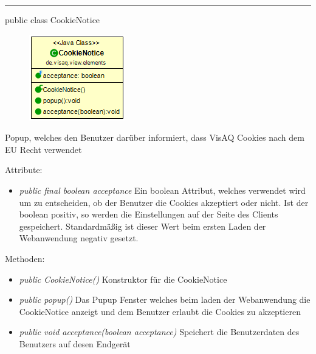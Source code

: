\clearpage %
\rule{\textwidth}{0.4pt}
public class CookieNotice

\begin{minipage}{0.3\textwidth}
    \begin{figure}[H]
        \includegraphics[scale = 0.6]{media/frontend/view/de.view.elements/CookieNotice_Class.png}
    \end{figure}
    \end{minipage} \hfill
    \begin{minipage}{0.6\textwidth}
Popup, welches den Benutzer darüber informiert, dass VisAQ Cookies nach dem EU Recht verwendet
\end{minipage}

Attribute:
\begin{itemize}
    \item \emph{public final boolean acceptance} Ein boolean Attribut, welches verwendet wird um zu entscheiden, ob der Benutzer die Cookies akzeptiert oder nicht. Ist der boolean positiv, so werden die Einstellungen auf der Seite des Clients gespeichert. Standardmäßig ist dieser Wert beim ersten Laden der Webanwendung negativ gesetzt.
\end{itemize}
Methoden:
\begin{itemize}
    \item \emph{public CookieNotice()} Konstruktor für die CookieNotice
    \item \emph{public popup()} Das Pupup Fenster welches beim laden der Webanwendung die CookieNotice anzeigt und dem Benutzer erlaubt die Cookies zu akzeptieren
    \item \emph{public void acceptance(boolean acceptance)} Speichert die Benutzerdaten des Benutzers auf desen Endgerät
\end{itemize}
